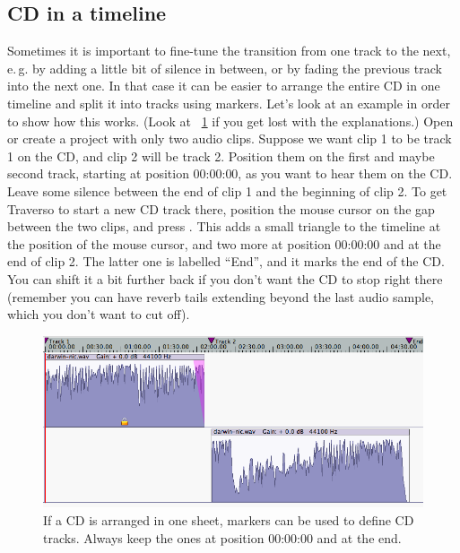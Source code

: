 \subsection{CD in a timeline}
Sometimes it is important to fine-tune the transition from one track to the next, e.\,g. by adding a little bit of silence in between, or by fading the previous track into the next one. In that case it can be easier to arrange the entire CD in one timeline and split it into tracks using markers. Let's look at an example in order to show how this works. (Look at \FigT~\ref{fig_markers01} if you get lost with the explanations.) Open or create a project with only two audio clips. Suppose we want clip 1 to be track 1 on the CD, and clip 2 will be track 2. Position them on the first and maybe second track, starting at position 00:00:00, as you want to hear them on the CD. Leave some silence between the end of clip 1 and the beginning of clip 2. To get Traverso to start a new CD track there, position the mouse cursor on the gap between the two clips, and press . This adds a small triangle to the timeline at the position of the mouse cursor, and two more at position 00:00:00 and at the end of clip 2. The latter one is labelled ``End'', and it marks the end of the CD. You can shift it a bit further back if you don't want the CD to stop right there (remember you  can have reverb tails extending beyond the last audio sample, which you don't want to cut off).

\begin{figure}[t]
 \centering\includegraphics[width=\textwidth]{../images/markers01}
 \caption{If a CD is arranged in one sheet, markers can be used to define CD tracks. Always keep the ones at position 00:00:00 and at the end.}
 \label{fig_markers01}
\end{figure}

